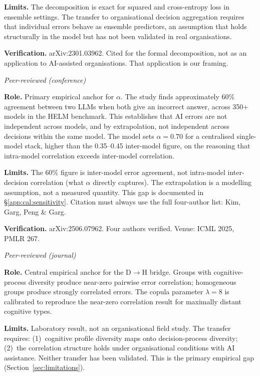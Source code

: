 \documentclass[11pt,a4paper]{article}
\begin{document}
\begin{appendices}
\begin{description}[style=nextline, leftmargin=0pt, labelindent=0pt]
\textbf{Limits.}
The decomposition is exact for squared and cross-entropy loss in ensemble
settings. The transfer to organisational decision aggregation requires that
individual errors behave as ensemble predictors, an assumption that holds
structurally in the model but has not been validated in real organisations.

\textbf{Verification.}
arXiv:2301.03962. Cited for the formal decomposition, not as an application
to AI-assisted organisations. That application is our framing.

\item[\cite{kim_icml_2025} --- Kim, Garg, Peng \& Garg (2025), ICML.]
\hfill\textit{Peer-reviewed (conference)}

\textbf{Role.}
Primary empirical anchor for $\alpha$. The study finds approximately 60\%
agreement between two LLMs when both give an incorrect answer, across 350+
models in the HELM benchmark. This establishes that AI errors are not
independent across models, and by extrapolation, not independent across
decisions within the same model. The model sets $\alpha = 0.70$ for a
centralised single-model stack, higher than the 0.35--0.45 inter-model
figure, on the reasoning that intra-model correlation exceeds inter-model
correlation.

\textbf{Limits.}
The 60\% figure is inter-model error agreement, not intra-model
inter-decision correlation (what $\alpha$ directly captures). The
extrapolation is a modelling assumption, not a measured quantity. This gap is
documented in \S\ref{app:cal:sensitivity}. Citation must always use the full
four-author list: Kim, Garg, Peng \& Garg.

\textbf{Verification.}
arXiv:2506.07962. Four authors verified. Venue: ICML 2025, PMLR 267.

\item[\cite{keck_psychsci_2020} --- Keck \& Tang (2020), Psychological
Science.]
\hfill\textit{Peer-reviewed (journal)}

\textbf{Role.}
Central empirical anchor for the D$\rightarrow$H bridge. Groups with
cognitive-process diversity produce near-zero pairwise error correlation;
homogeneous groups produce strongly correlated errors. The copula parameter
$\lambda = 8$ is calibrated to reproduce the near-zero correlation result
for maximally distant cognitive types.

\textbf{Limits.}
Laboratory result, not an organisational field study. The transfer requires:
(1)~cognitive profile diversity maps onto decision-process diversity;
(2)~the correlation structure holds under organisational conditions with AI
assistance. Neither transfer has been validated. This is the primary
empirical gap (Section~\ref{sec:limitations}).


\end{description}
\end{appendices}
\end{document}

